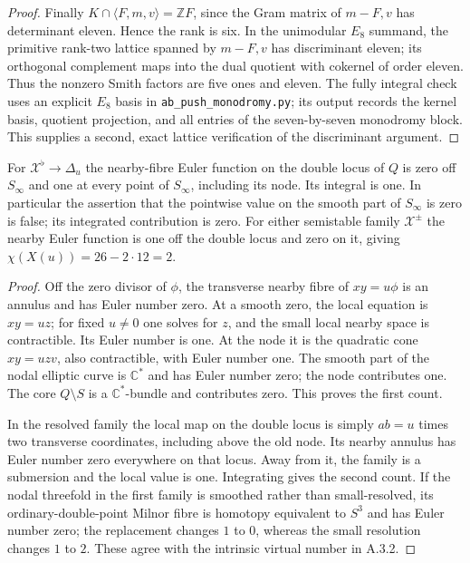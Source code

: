 \begin{proof}
Finally $K\cap\langle F,m,v\rangle=\mathbb ZF$, since
the Gram matrix of $m-F,v$ has determinant eleven.
Hence the rank is six. In the unimodular $E_8$ summand,
the primitive rank-two lattice spanned by $m-F,v$ has
discriminant eleven; its orthogonal complement maps into
the dual quotient with cokernel of order eleven. Thus the
nonzero Smith factors are five ones and eleven. The fully
integral check uses an explicit $E_8$ basis in
\texttt{ab\_push\_monodromy.py}; its output records the
kernel basis, quotient projection, and all entries of the
seven-by-seven monodromy block. This supplies a second,
exact lattice verification of the discriminant argument.
\end{proof}

\begin{proposition}\label{push:src:A.4.3}\label{push:A43}
For $\mathcal X^\flat\to\Delta_u$ the nearby-fibre Euler
function on the double locus of $Q$ is zero off $S_\infty$
and one at every point of $S_\infty$, including its node.
Its integral is one. In particular the assertion that the
pointwise value on the smooth part of $S_\infty$ is zero
is false; its integrated contribution is zero.
For either semistable family $\mathcal X^\pm$ the nearby
Euler function is one off the double locus and zero on
it, giving $\chi(X(u))=26-2\cdot12=2$.
\end{proposition}
\begin{proof}
Off the zero divisor of $\phi$, the transverse nearby
fibre of $xy=u\phi$ is an annulus and has Euler number
zero. At a smooth zero, the local equation is $xy=uz$;
for fixed $u\ne0$ one solves for $z$, and the small
local nearby space is contractible. Its Euler number
is one. At the node it is the quadratic cone
$xy=uzv$, also contractible, with Euler number one.
The smooth part of the nodal elliptic curve is
$\mathbb C^*$ and has Euler number zero; the node
contributes one. The core $Q\setminus S$ is a
$\mathbb C^*$-bundle and contributes zero.
This proves the first count.

In the resolved family the local map on the double locus
is simply $ab=u$ times two transverse coordinates,
including above the old node. Its nearby annulus has
Euler number zero everywhere on that locus. Away from
it, the family is a submersion and the local value is
one. Integrating gives the second count. If the nodal
threefold in the first family is smoothed rather than
small-resolved, its ordinary-double-point Milnor fibre
is homotopy equivalent to $S^3$ and has Euler number
zero; the replacement changes $1$ to $0$, whereas
the small resolution changes $1$ to $2$. These agree
with the intrinsic virtual number in A.3.2.
\end{proof}


